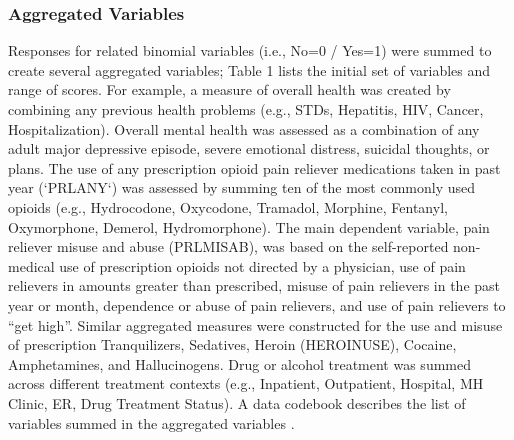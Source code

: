 \documentclass[sigconf]{acmart}
\begin{document}
\subsubsection{Aggregated Variables} 

Responses for related binomial variables (i.e., No=0 / Yes=1) were summed to 
create several aggregated variables; Table 1 lists the initial set of
variables and range of scores. For example, a measure of overall health 
was created by combining any previous health problems (e.g., STDs, Hepatitis,
HIV, Cancer, Hospitalization). Overall mental health was assessed as a   
combination of any adult major depressive episode, severe emotional distress, 
suicidal thoughts, or plans. The use of any prescription opioid pain reliever 
medications taken in past year (`PRLANY`) was assessed by summing ten of the 
most commonly used opioids (e.g., Hydrocodone, Oxycodone, Tramadol, Morphine, 
Fentanyl, Oxymorphone, Demerol, Hydromorphone). The main dependent variable, 
pain reliever misuse and abuse (PRLMISAB), was based on the self-reported 
non-medical use of prescription opioids not directed by a physician, use of 
pain relievers in amounts greater than prescribed, misuse of pain relievers in 
the past year or month, dependence or abuse of pain relievers, and use of pain 
relievers to ``get high''. Similar aggregated measures were constructed for the 
use and misuse of prescription Tranquilizers, Sedatives, Heroin (HEROINUSE), 
Cocaine, Amphetamines, and Hallucinogens. Drug or alcohol treatment was summed 
across different treatment contexts (e.g., Inpatient, Outpatient, Hospital, 
MH Clinic, ER, Drug Treatment Status). A data codebook describes the list of 
variables summed in the aggregated variables . 
\end{document}
